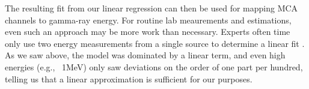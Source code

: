 The resulting fit from our linear regression can then be used for mapping
MCA channels to gamma-ray energy. For routine lab meaurements and estimations,
even such an approach may be more work than necessary. Experts often time only
use two energy measurements from a single source to determine a linear fit
\cite{gilmore_2011}. As we saw above, the model was dominated by a linear term, and
even high energies (e.g., ~1MeV) only saw deviations on the order of one part
per hundred, telling us that a linear approximation is sufficient for our
purposes.
